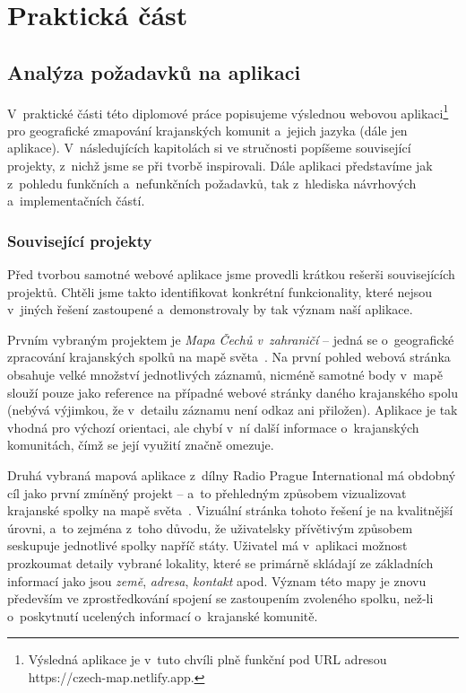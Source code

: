 \part{Praktická část}

\hypertarget{analuxfdza-poux17eadavkux16f-na-aplikaci}{%
\chapter{Analýza požadavků na aplikaci}\label{analuxfdza-poux17eadavkux16f-na-aplikaci}}

V~praktické části této diplomové práce popisujeme výslednou webovou aplikaci\footnote{Výsledná aplikace je v~tuto chvíli plně funkční pod URL adresou https://czech-map.netlify.app.} pro geografické zmapování krajanských komunit a~jejich jazyka (dále jen aplikace). V~následujících kapitolách si ve stručnosti popíšeme související projekty, z~nichž jsme se při tvorbě inspirovali. Dále aplikaci představíme jak z~pohledu funkčních a~nefunkčních požadavků, tak z~hlediska návrhových a~implementačních částí.

\hypertarget{souvisejuxedcuxed-projekty}{%
\section{Související projekty}\label{souvisejuxedcuxed-projekty}}

Před tvorbou samotné webové aplikace jsme provedli krátkou rešerši souvisejících projektů. Chtěli jsme takto identifikovat konkrétní funkcionality, které nejsou v~jiných řešení zastoupené a~demonstrovaly by tak význam naší aplikace.

Prvním vybraným projektem je \emph{Mapa Čechů v~zahraničí} -- jedná se o~geografické zpracování krajanských spolků na mapě světa~\parencite{mapa1}. Na první pohled webová stránka obsahuje velké množství jednotlivých záznamů, nicméně samotné body v~mapě slouží pouze jako reference na případné webové stránky daného krajanského spolu (nebývá výjimkou, že v~detailu záznamu není odkaz ani přiložen). Aplikace je tak vhodná pro výchozí orientaci, ale chybí v~ní další informace o~krajanských komunitách, čímž se její využití značně omezuje.

Druhá vybraná mapová aplikace z~dílny Radio Prague International má obdobný cíl jako první zmíněný projekt -- a~to přehledným způsobem vizualizovat krajanské spolky na mapě světa~\parencite{mapa2}. Vizuální stránka tohoto řešení je na kvalitnější úrovni, a~to zejména z~toho důvodu, že uživatelsky přívětivým způsobem seskupuje jednotlivé spolky napříč státy. Uživatel má v~aplikaci možnost prozkoumat detaily vybrané lokality, které se primárně skládají ze základních informací jako jsou \emph{země}, \emph{adresa}, \emph{kontakt} apod. Význam této mapy je znovu především ve zprostředkování spojení se zastoupením zvoleného spolku, než-li o~poskytnutí ucelených informací o~krajanské komunitě.

